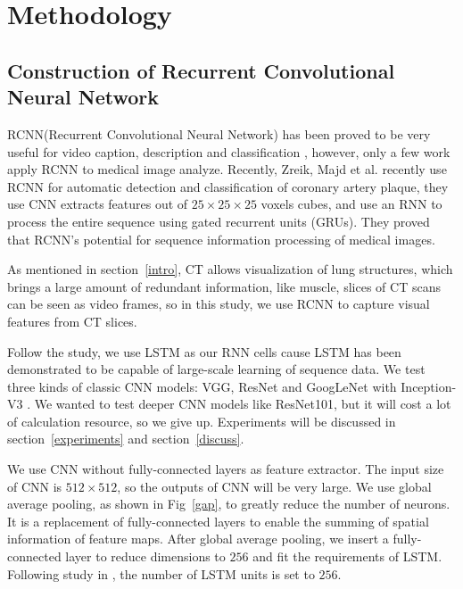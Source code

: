 \section{Methodology}
\label{methodology}

\subsection{Construction of Recurrent Convolutional Neural Network}
\label{RCNN}
RCNN(Recurrent Convolutional Neural Network) has been proved to be very useful for video caption, description and classification \cite{Donahue2015Long}\cite{Aafaq2019Spatio}, however, only a few work apply RCNN to medical image analyze. Recently, Zreik, Majd et al. \cite{Zreik2018A} recently use RCNN for automatic detection and classification of coronary artery plaque, they use CNN extracts features out of $ 25\times25\times25$ voxels cubes, and  use an RNN to process the entire sequence using gated recurrent units (GRUs)\cite{chung2014empirical}. They proved that RCNN's potential for sequence information processing of medical images. 

As mentioned in section~\ref{intro}, CT allows visualization of lung structures, which brings a large amount of redundant information, like muscle,
slices of CT scans can be seen as video frames, so in this study, we use RCNN to capture visual features from CT slices.

Follow the study\cite{Donahue2015Long}, we use LSTM as our RNN cells cause LSTM has been demonstrated to be capable of large-scale learning of sequence data. We test three kinds of classic CNN models: VGG\cite{simonyan2015very}, ResNet\cite{he2016deep} and GoogLeNet with Inception-V3 \cite{szegedy2016rethinking}. 
We wanted to test deeper CNN models like ResNet101, but it will cost a lot of calculation resource, so we give up. Experiments will be discussed in section~\ref{experiments} and section~\ref{discuss}.

We use CNN without fully-connected layers as feature extractor. The input size of CNN is $512 \times 512$, so the outputs of CNN will be very large. We use global average pooling\cite{lin2014network}, as shown in Fig~\ref{gap}, to greatly reduce the number of neurons. It is a replacement of fully-connected layers to enable the summing of spatial information of feature maps. After global average pooling, we insert a fully-connected layer to reduce dimensions to $256$ and fit the requirements of LSTM. Following study in \cite{Donahue2015Long}, the number of LSTM units is set to $256$.

